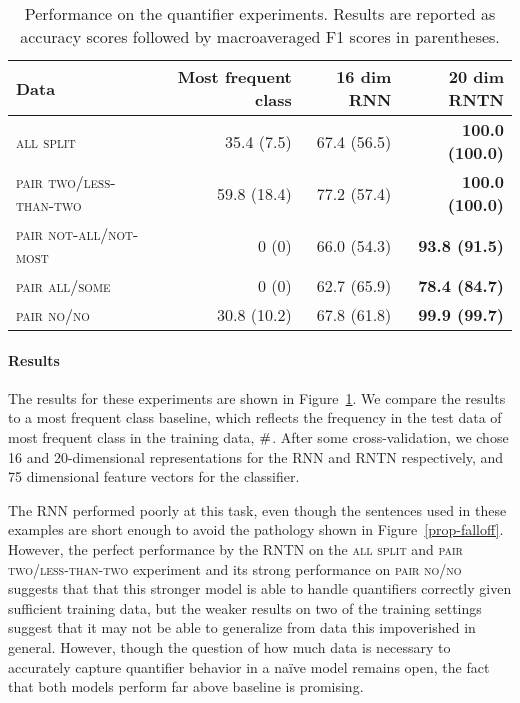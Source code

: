 \begin{table}[tp]
  \centering
  \begin{tabular}{ l rrr }
    \toprule
    Data & Most frequent class & 16 dim RNN  & 20 dim RNTN\\
    \midrule
    \textsc{all split}	& 35.4 (7.5) &	67.4 (56.5)&	\textbf{100.0 (100.0)}
    \\[1ex]    
    \textsc{pair two/less-than-two}	& 59.8 (18.4) &	77.2 (57.4) &	\textbf{100.0 (100.0)} \\
    \textsc{pair not-all/not-most}	&0 (0) & 66.0 (54.3) &	\textbf{93.8 (91.5)} \\
    \textsc{pair all/some}	& 0 (0) & 62.7 (65.9)  &	\textbf{78.4 (84.7)} \\
    \textsc{pair no/no}	& 30.8 (10.2) &	67.8 (61.8) &	\textbf{99.9 (99.7)} \\
    \bottomrule
  \end{tabular}
  \caption{Performance on the quantifier experiments. Results are reported as accuracy scores followed by macroaveraged F1 scores in parentheses.}
  \label{resultstable}
\end{table} 


\paragraph{Results} 
The results for these experiments are shown in
Figure~\ref{resultstable}. We compare the results to a most frequent
class baseline, which reflects the frequency in the test data of most
frequent class in the training data, $\mathbin{\#}$.  After some
cross-validation, we chose 16 and 20-dimensional
representations for the RNN and RNTN respectively, and 75 dimensional 
feature vectors for the classifier.

The RNN performed poorly at this task, even though the sentences used
in these examples are short enough to avoid the pathology shown in
Figure~\ref{prop-falloff}.  However, the perfect performance by the
RNTN on the \textsc{all split} and \textsc{pair two/less-than-two} 
experiment and its strong performance on \textsc{pair no/no} suggests
that that this stronger model is able to handle quantifiers correctly
given sufficient training data, but the weaker results on two of the
training settings suggest that it may not be able to generalize from
data this impoverished in general. However, though the question of how
much data is necessary to accurately capture quantifier behavior in a
na\"ive model remains open, the fact that both models perform far
above baseline is promising.